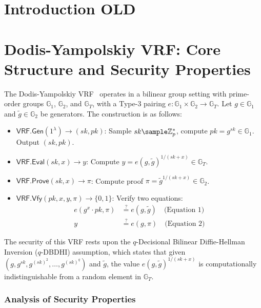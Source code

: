 \newpage
\section{Introduction OLD}






\newpage
\section{Dodis-Yampolskiy VRF: Core Structure and Security Properties}

The Dodis-Yampolskiy VRF~\cite{hutchison_verifiable_2005} operates in a bilinear group setting with prime-order groups $\mathbb{G}_1$, $\mathbb{G}_2$, and $\mathbb{G}_T$, with a Type-3 pairing $e: \mathbb{G}_1 \times \mathbb{G}_2 \rightarrow \mathbb{G}_T$. Let $g \in \mathbb{G}_1$ and $\tilde{g} \in \mathbb{G}_2$ be generators. The construction is as follows:

\begin{itemize}
    \item $\mathsf{VRF.Gen}(1^\lambda) \to (sk, pk)$: Sample $sk \sample \mathbb{Z}_p^*$, compute $pk = g^{sk} \in \mathbb{G}_1$. Output $(sk, pk)$.
    
    \item $\mathsf{VRF.Eval}(sk, x) \to y$: Compute $y = e(g, \tilde{g})^{1/(sk + x)} \in \mathbb{G}_T$.
    
    \item $\mathsf{VRF.Prove}(sk, x) \to \pi$: Compute proof $\pi = \tilde{g}^{1/(sk + x)} \in \mathbb{G}_2$.
    
    \item $\mathsf{VRF.Vfy}(pk, x, y, \pi) \to \{0, 1\}$: Verify two equations:
    \begin{align}
        e(g^{x} \cdot pk, \pi) &\stackrel{?}{=} e(g, \tilde{g}) \quad \text{(Equation 1)}\\
        y &\stackrel{?}{=} e(g, \pi) \quad \text{(Equation 2)}
    \end{align}
\end{itemize}

The security of this VRF rests upon the $q$-Decisional Bilinear Diffie-Hellman Inversion ($q$-DBDHI) assumption, which states that given $(g, g^{sk}, g^{(sk)^2}, \ldots, g^{(sk)^q})$ and $\tilde{g}$, the value $e(g, \tilde{g})^{1/(sk+x)}$ is computationally indistinguishable from a random element in $\mathbb{G}_T$.

\subsubsection{Analysis of Security Properties}

